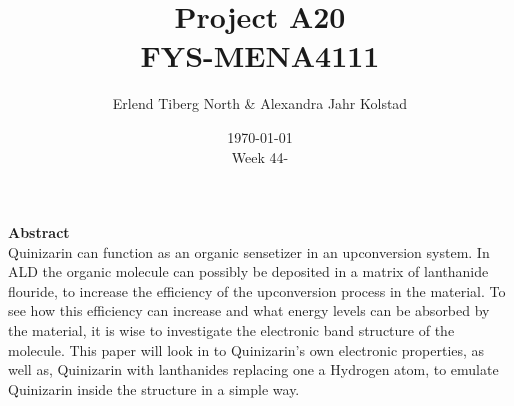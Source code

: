\documentclass{article}
\begin{document}
\addtocounter{page}{0}

\title{Project A20 \\
      \large FYS-MENA4111}
\date{\today \\
    \vspace{1mm}
    \large Week 44-}

\author{Erlend Tiberg North \& Alexandra Jahr Kolstad}

\maketitle






\vspace{1cm}


\begin{center}

{\Large\textbf{Abstract}} \label{sec:Abstract} \\

    Quinizarin can function as an organic sensetizer in an upconversion system. In ALD the organic molecule can possibly be deposited in a matrix of lanthanide flouride, to increase the efficiency of the upconversion process in the material. To see how this efficiency can increase and what energy levels can be absorbed by the material, it is wise to investigate the electronic band structure of the molecule. This paper will look in to Quinizarin's own electronic properties, as well as, Quinizarin with lanthanides replacing one a Hydrogen atom, to emulate Quinizarin inside the structure in a simple way.

    \vspace{1cm}

\end{center}


\newpage

\vspace{1cm}

\tableofcontents

\vspace{1cm}

\end{document}

